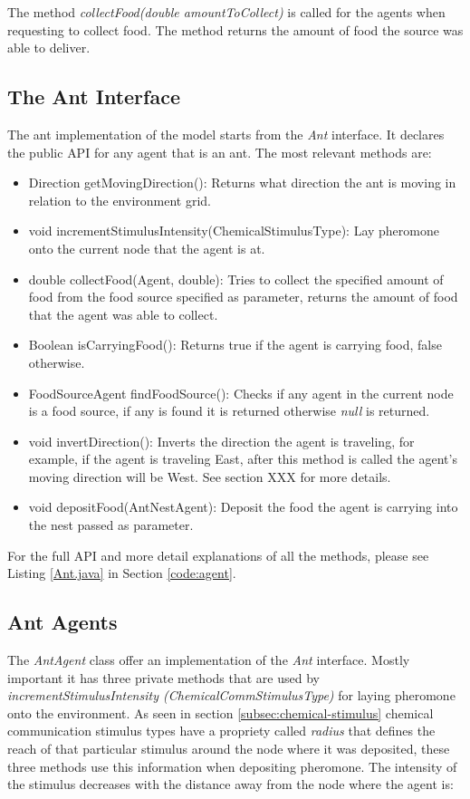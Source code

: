 The method \emph{collectFood(double amountToCollect)} is called for the agents when requesting to collect food. The method returns the amount of food the source was able to deliver.

\subsection{The Ant Interface}

The ant implementation of the model starts from the \emph{Ant} interface. It declares the public \ac{API} for any agent that is an ant. The most relevant methods are: 

\begin{itemize}
  \item Direction getMovingDirection(): Returns what direction the ant is moving in relation to the environment grid.
  \item void incrementStimulusIntensity(ChemicalStimulusType): Lay pheromone onto the current node that the agent is at.
  \item double collectFood(Agent, double): Tries to collect the specified amount of food from the food source specified as parameter, returns the amount of food that the agent was able to collect.
  \item Boolean isCarryingFood(): Returns true if the agent is carrying food, false otherwise.
  \item FoodSourceAgent findFoodSource(): Checks if any agent in the current node is a food source, if any is found it is returned otherwise \emph{null} is returned.
  \item void invertDirection(): Inverts the direction the agent is traveling, for example, if the agent is traveling East, after this method is called the agent's moving direction will be West. See section XXX for more details.
  \item void depositFood(AntNestAgent): Deposit the food the agent is carrying into the nest passed as parameter.
\end{itemize}

For the full \ac{API} and more detail explanations of all the methods, please see Listing \ref{Ant.java} in Section \ref{code:agent}.

\subsection{Ant Agents}
\label{sec:pheromone-deposit}

The \emph{AntAgent} class offer an implementation of the \emph{Ant} interface. Mostly important it has three private methods that are used by \emph{incrementStimulusIntensity (ChemicalCommStimulusType)} for laying pheromone onto the environment. As seen in section \ref{subsec:chemical-stimulus} chemical communication stimulus types have a propriety called \emph{radius} that defines the reach of that particular stimulus around the node where it was deposited, these three methods use this information when depositing pheromone. The intensity of the stimulus decreases with the distance away from the node where the agent is:

